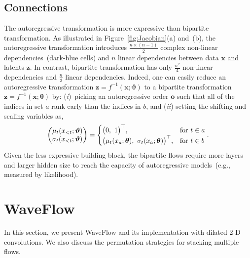 \documentclass{article}
\newcommand{\vv}[1]{\boldsymbol{#1}}
\begin{document}
\subsection{Connections}
\label{subsec:auto_vs_bipartite}
\vspace{-.1em}
The autoregressive transformation is more expressive than bipartite transformation.
As illustrated in Figure~\ref{fig:Jacobian}(a) and~(b), the autoregressive transformation introduces $\frac{n\times(n-1)}{2}$ complex non-linear dependencies~(dark-blue cells) and $n$ linear dependencies between data $\vv x$ and latents $\vv z$. 
In contrast, bipartite transformation has only $\frac{n^2}{4}$ non-linear dependencies and $\frac{n}{2}$ linear dependencies.
Indeed, one can easily reduce an autoregressive transformation $\vv z = f^{-1}(\vv x; \vv\vartheta)$ to a bipartite transformation $\vv z = f^{-1}(\vv x; \vv\theta)$ by: (\emph{i})~picking an autoregressive order $\vv o$ such that all of the indices in set $a$ rank early than the indices in $b$, and (\emph{ii}) setting the shifting and scaling variables as,
\vspace{-.6em}
\begin{align*}
\begin{pmatrix}
\mu_{t}(x_{<t}; \vv\vartheta) \\
\sigma_{t}(x_{<t}; \vv\vartheta)
\end{pmatrix}
 = 
\begin{cases}
\big(0,~ 1\big)^{\top},   &\text{for $t\in a$}\\
\big( \mu_{t}(x_{a}; \vv\theta),~ \sigma_{t}(x_{a}; \vv\theta) \big)^\top, & \text{for $t \in b$}
\end{cases}.
\vspace{-1.5em}
\end{align*}
Given the less expressive building block, the bipartite flows require more layers and larger hidden size to reach the capacity of autoregressive models~(e.g., measured by likelihood).


\vspace{-.2em}
\section{WaveFlow}
\label{sec:waveflow}
\vspace{-.1em}
In this section, we present WaveFlow and its implementation with dilated 2-D convolutions. We also discuss the permutation strategies for stacking multiple flows.
\vspace{-.2em}
\end{document}
